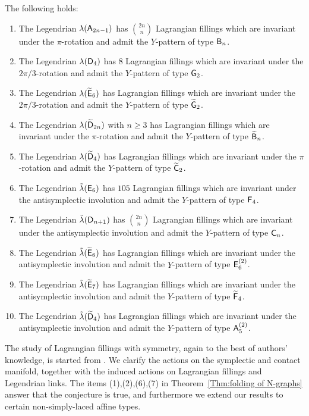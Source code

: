 \begin{theorem}\label{Thm:folding of N-graphs}
The following holds:
\begin{enumerate}
\item The Legendrian $\lambda(\mathsf{A}_{2n-1})$ has $\binom{2n}{n}$ Lagrangian fillings which are invariant under the $\pi$-rotation and  admit the $Y$-pattern of type $\mathsf{B}_n$.
\item The Legendrian $\lambda(\mathsf{D}_{4})$ has $8$ Lagrangian fillings which are invariant under the $2\pi/3$-rotation and admit the $Y$-pattern of type $\mathsf{G}_2$.
\item The Legendrian $\lambda(\widetilde{\mathsf{E}}_{6})$ has Lagrangian fillings which are invariant under the $2\pi/3$-rotation and admit the $Y$-pattern of type $\widetilde{\mathsf{G}}_2$.
\item The Legendrian $\lambda(\widetilde{\mathsf{D}}_{2n})$ with $n\ge 3$ has Lagrangian fillings which are invariant under the $\pi$-rotation and admit the $Y$-pattern of type $\widetilde{\mathsf{B}}_n$.
\item The Legendrian $\lambda(\widetilde{\mathsf{D}}_4)$ has Lagrangian fillings which are invariant under the $\pi$-rotation and admit the $Y$-pattern of type $\widetilde{\mathsf{C}}_2$.
%
\item The Legendrian $\tilde\lambda(\mathsf{E}_{6})$ has $105$ Lagrangian fillings which are invariant under the antisymplectic involution and admit the $Y$-pattern of type $\mathsf{F}_4$.
\item The Legendrian $\tilde\lambda(\mathsf{D}_{n+1})$ has $\binom{2n}{n}$ Lagrangian fillings which are invariant under the antisymplectic involution and admit the $Y$-pattern of type $\mathsf{C}_n$.
\item The Legendrian $\tilde\lambda(\widetilde{\mathsf{E}}_{6})$ has Lagrangian fillings which are invariant under the antisymplectic involution and admit the $Y$-pattern of type $\mathsf{E}_6^{(2)}$.
\item The Legendrian $\tilde\lambda(\widetilde{\mathsf{E}}_{7})$ has Lagrangian fillings which are invariant under the antisymplectic involution and admit the $Y$-pattern of type $\widetilde{\mathsf{F}}_4$.
\item The Legendrian $\tilde\lambda(\widetilde{\mathsf{D}}_4)$ has Lagrangian fillings which are invariant under the antisymplectic involution and admit the $Y$-pattern of type $\mathsf{A}_5^{(2)}$.
\end{enumerate}
\end{theorem}

The study of Lagrangian fillings with symmetry, again to the best of authors' knowledge, is started from \cite{Cas2020}. We clarify the actions on the symplectic and contact manifold, together with the induced actions on Lagrangian fillings and Legendrian links. The items (1),(2),(6),(7) in Theorem~\ref{Thm:folding of N-graphs} answer that the conjecture \cite[Conjecture 5.4]{Cas2020} is true, and furthermore we extend our results to certain non-simply-laced affine types.


